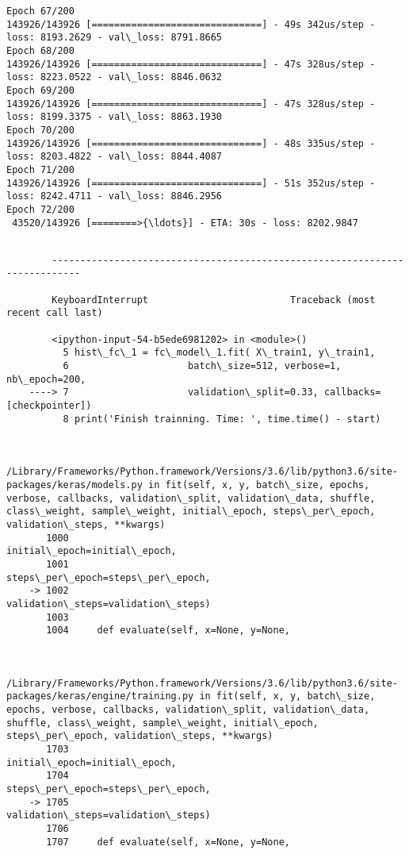 \documentclass[11pt]{article}
\begin{document}
\begin{Verbatim}[commandchars=\\\{\}]
Epoch 67/200
143926/143926 [==============================] - 49s 342us/step - loss: 8193.2629 - val\_loss: 8791.8665
Epoch 68/200
143926/143926 [==============================] - 47s 328us/step - loss: 8223.0522 - val\_loss: 8846.0632
Epoch 69/200
143926/143926 [==============================] - 47s 328us/step - loss: 8199.3375 - val\_loss: 8863.1930
Epoch 70/200
143926/143926 [==============================] - 48s 335us/step - loss: 8203.4822 - val\_loss: 8844.4087
Epoch 71/200
143926/143926 [==============================] - 51s 352us/step - loss: 8242.4711 - val\_loss: 8846.2956
Epoch 72/200
 43520/143926 [========>{\ldots}] - ETA: 30s - loss: 8202.9847
    \end{Verbatim}

    \begin{Verbatim}[commandchars=\\\{\}]

        ---------------------------------------------------------------------------

        KeyboardInterrupt                         Traceback (most recent call last)

        <ipython-input-54-b5ede6981202> in <module>()
          5 hist\_fc\_1 = fc\_model\_1.fit( X\_train1, y\_train1,
          6                     batch\_size=512, verbose=1, nb\_epoch=200,
    ----> 7                     validation\_split=0.33, callbacks=[checkpointer])
          8 print('Finish trainning. Time: ', time.time() - start)


        /Library/Frameworks/Python.framework/Versions/3.6/lib/python3.6/site-packages/keras/models.py in fit(self, x, y, batch\_size, epochs, verbose, callbacks, validation\_split, validation\_data, shuffle, class\_weight, sample\_weight, initial\_epoch, steps\_per\_epoch, validation\_steps, **kwargs)
       1000                               initial\_epoch=initial\_epoch,
       1001                               steps\_per\_epoch=steps\_per\_epoch,
    -> 1002                               validation\_steps=validation\_steps)
       1003 
       1004     def evaluate(self, x=None, y=None,


        /Library/Frameworks/Python.framework/Versions/3.6/lib/python3.6/site-packages/keras/engine/training.py in fit(self, x, y, batch\_size, epochs, verbose, callbacks, validation\_split, validation\_data, shuffle, class\_weight, sample\_weight, initial\_epoch, steps\_per\_epoch, validation\_steps, **kwargs)
       1703                               initial\_epoch=initial\_epoch,
       1704                               steps\_per\_epoch=steps\_per\_epoch,
    -> 1705                               validation\_steps=validation\_steps)
       1706 
       1707     def evaluate(self, x=None, y=None,



\end{Verbatim}
\end{document}
